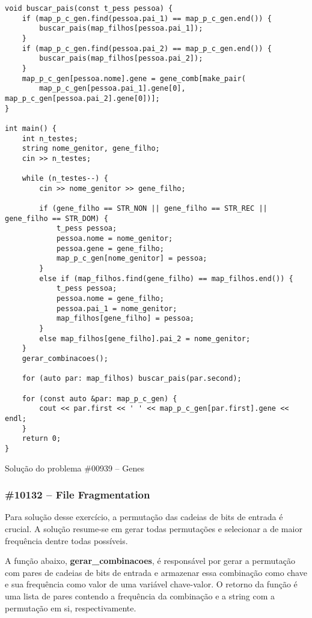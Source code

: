 \documentclass[a4paper,12pt]{scrartcl}
\begin{document}
\begin{listing}[H]
\begin{verbatim}
void buscar_pais(const t_pess pessoa) {
    if (map_p_c_gen.find(pessoa.pai_1) == map_p_c_gen.end()) {
        buscar_pais(map_filhos[pessoa.pai_1]);
    }
    if (map_p_c_gen.find(pessoa.pai_2) == map_p_c_gen.end()) {
        buscar_pais(map_filhos[pessoa.pai_2]);
    }
    map_p_c_gen[pessoa.nome].gene = gene_comb[make_pair(
        map_p_c_gen[pessoa.pai_1].gene[0], map_p_c_gen[pessoa.pai_2].gene[0])];
}

int main() {
    int n_testes;
    string nome_genitor, gene_filho;
    cin >> n_testes;

    while (n_testes--) {
        cin >> nome_genitor >> gene_filho;

        if (gene_filho == STR_NON || gene_filho == STR_REC || gene_filho == STR_DOM) {
            t_pess pessoa;
            pessoa.nome = nome_genitor;
            pessoa.gene = gene_filho;
            map_p_c_gen[nome_genitor] = pessoa;
        }
        else if (map_filhos.find(gene_filho) == map_filhos.end()) {
            t_pess pessoa;
            pessoa.nome = gene_filho;
            pessoa.pai_1 = nome_genitor;
            map_filhos[gene_filho] = pessoa;
        }
        else map_filhos[gene_filho].pai_2 = nome_genitor;
    }
    gerar_combinacoes();

    for (auto par: map_filhos) buscar_pais(par.second);

    for (const auto &par: map_p_c_gen) {
        cout << par.first << ' ' << map_p_c_gen[par.first].gene << endl;
    }
    return 0;
}
\end{verbatim}
\caption{\footnotesize{Solução do problema \#00939 – Genes}}
\end{listing}

\subsubsection{\#10132 – File Fragmentation}
Para solução desse exercício, a permutação das cadeias de bits de entrada é crucial. A solução resume-se em gerar todas permutações e selecionar a de maior frequência dentre todas possíveis.

A função abaixo, \textbf{gerar\_combinacoes}, é responsável por gerar a permutação com pares de cadeias de bits de entrada e armazenar essa combinação como chave e sua frequência como valor de uma variável chave-valor. O retorno da função é uma lista de pares contendo a frequência da combinação e a string com a permutação em si, respectivamente.
\end{document}
